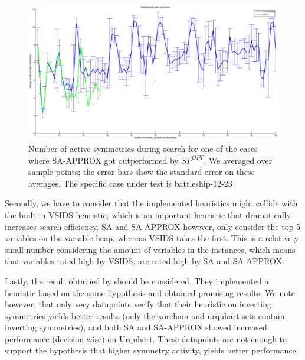	\begin{figure}[!ht]
		\center
		\centerline{\includegraphics[width=1.2\textwidth]{results/battleship-12-23-approx-vs-reg.eps}}
		\caption{
			Number of active symmetries during search for one of the cases where SA-APPROX got
			outperformed by $SP^{OPT}$.
			We averaged over sample points; the error bars show the standard error on these
			averages.
			The specific case under test is battleship-12-23
		}
		\label{fig:active_symmetries_during_search}
	\end{figure}

	Secondly, we have to consider that the implemented heuristics might collide with the built-in
	VSIDS heuristic, which is an important heuristic that dramatically increases search efficiency.
	SA and SA-APPROX however, only consider the top 5 variables on the variable heap, whereas VSIDS
	takes the first.
	This is a relatively small number considering the amount of variables in the instances,
	which means that variables rated high by VSIDS, are rated high by SA and SA-APPROX.

	Lastly, the result obtained by \cite{devriendt2012symmetry} should be considered.
	They implemented a heuristic based on the same hypothesis and obtained promising results.
	We note however, that only very datapoints verify that their heuristic on inverting symmetries
	yields better results (only the xorchain and urquhart sets contain inverting symmetries), and
	both SA and SA-APPROX showed increased performance (decision-wise) on Urquhart.
	These datapoints are not enough to support the hypothesis that higher symmetry activity, yields
	better performance.
